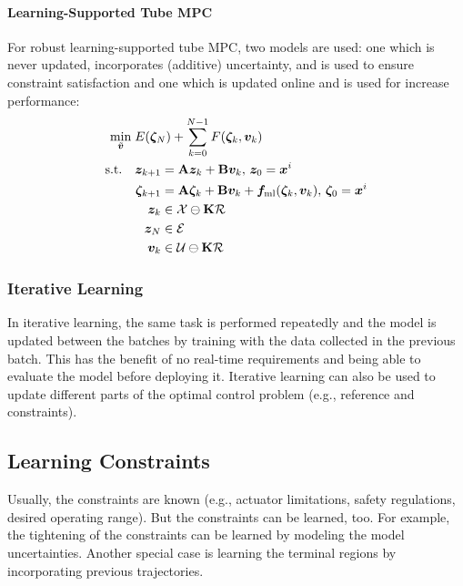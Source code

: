 				\paragraph{Learning-Supported Tube MPC}
					For robust learning-supported tube MPC, two models are used: one which is never updated, incorporates (additive) uncertainty, and is used to ensure constraint satisfaction and one which is updated online and is used for increase performance:
					\begin{equation}
						\begin{aligned}
							\min_{\tilde{\bm{v}}}\; & E(\bm{\zeta}_N) + \sum_{k = 0}^{N - 1} F(\bm{\zeta}_k, \bm{v}_k) \\
							\text{s.t.}\quad&
								\begin{aligned}[t]
									\bm{z}_{k + 1} &= \bm{\mathrm{A}} \bm{z}_k + \bm{\mathrm{B}} \bm{v}_k,\, \bm{z}_0 = \bm{x}^i \\
									\bm{\zeta}_{k + 1} &= \bm{\mathrm{A}} \bm{\zeta}_k + \bm{\mathrm{B}} \bm{v}_k + \bm{f}_\mathrm{ml}(\bm{\zeta}_k, \bm{v}_k),\, \bm{\zeta}_0 = \bm{x}^i \\
									\bm{z}_k &\in \mathcal{X} \ominus \bm{\mathrm{K}} \mathcal{R} \\
									\bm{z}_N &\in \mathcal{E} \\
									\bm{v}_k &\in \mathcal{U} \ominus \bm{\mathrm{K}} \mathcal{R}
								\end{aligned}
						\end{aligned}
					\end{equation}

			\subsubsection{Iterative Learning}
				In iterative learning, the same task is performed repeatedly and the model is updated between the batches by training with the data collected in the previous batch. This has the benefit of no real-time requirements and being able to evaluate the model before deploying it. Iterative learning can also be used to update different parts of the optimal control problem (e.g., reference and constraints).

		\subsection{Learning Constraints}
			Usually, the constraints are known (e.g., actuator limitations, safety regulations, desired operating range). But the constraints can be learned, too. For example, the tightening of the constraints can be learned by modeling the model uncertainties. Another special case is learning the terminal regions by incorporating previous trajectories.

